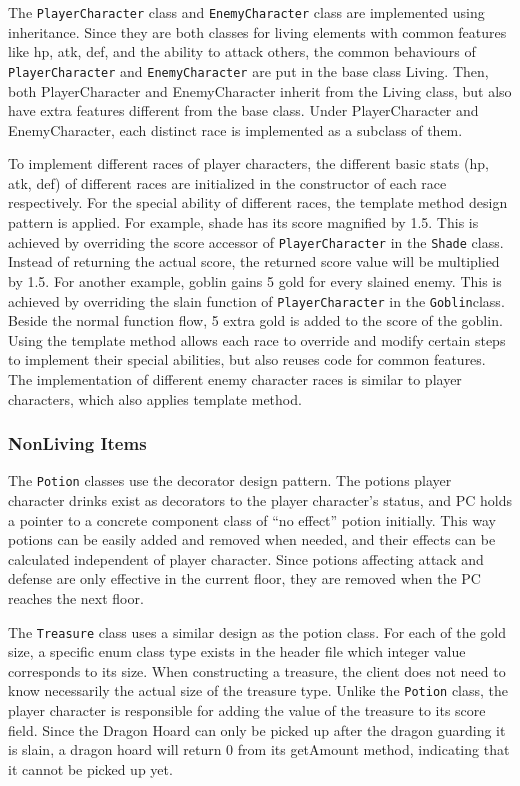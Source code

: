 \documentclass[11pt]{article}
\theoremstyle{plain} \newtheorem{theorem*}{Theorem}[subsection]
\begin{document}
The \texttt{PlayerCharacter} class and \texttt{EnemyCharacter} class are 
implemented using inheritance. 
Since they are both classes for living elements with common
features like hp, atk, def, and the ability to attack others, the common
behaviours of \texttt{PlayerCharacter} and \texttt{EnemyCharacter}
are put in the base class Living. 
Then, both PlayerCharacter and EnemyCharacter inherit from the Living
class, but also have extra features different from the base class. Under
PlayerCharacter and EnemyCharacter, each distinct race is implemented as a
subclass of them. 


To implement different races of player characters, the different basic stats
(hp, atk, def) of different races are initialized in the constructor of each
race respectively. For the special ability of different races, the template
method design pattern is applied. For example, shade has its score magnified by
1.5. This is achieved by overriding the score accessor of
\texttt{PlayerCharacter} in the \texttt{Shade} class. 
Instead of returning the actual score, the returned score
value will be multiplied by 1.5. For another example, goblin gains 5 gold for
every slained enemy. This is achieved by overriding the slain function of
\texttt{PlayerCharacter} in the \texttt{Goblin}class. 
Beside the normal function flow, 5 extra
gold is added to the score of the goblin.
Using the template method allows each race to override and modify certain steps
to implement their special abilities,
but also reuses code for common features. The implementation of different
enemy character races is similar to player characters, 
which also applies template method.

\subsubsection{NonLiving Items}

The \texttt{Potion} classes use the decorator design pattern. 
The potions player
character drinks exist as decorators to the player character’s status, and PC
holds a pointer to a concrete component class of “no effect” potion initially.
This way potions can be easily added and removed when needed, and their effects
can be calculated independent of player character. Since potions affecting
attack and defense are only effective in the current floor, they are removed
when the PC reaches the next floor.  

The \texttt{Treasure}
class uses a similar design as the potion class. For each of the
gold size, a specific enum class type exists in the header file which integer
value corresponds to its size. When constructing a treasure, the client does
not need to know necessarily the actual size of the treasure type. Unlike the
\texttt{Potion}
class, the player character is responsible for adding the value of the
treasure to its score field. Since the Dragon Hoard can only be picked up after
the dragon guarding it is slain, a dragon hoard will return 0 from its
getAmount method, indicating that it cannot be picked up yet.  
\end{document}
